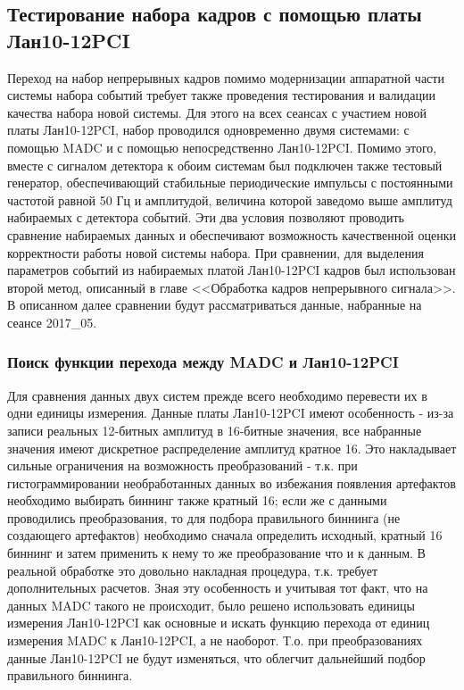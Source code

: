 \documentclass[a4paper,14pt]{extreport}
\begin{document}
\subsection{Тестирование набора кадров с помощью платы Лан10-12PCI}
Переход на набор непрерывных кадров помимо модернизации аппаратной части системы набора событий требует также проведения тестирования и валидации качества набора новой системы. Для этого на всех сеансах с участием новой платы Лан10-12PCI, набор проводился одновременно двумя системами: с помощью MADC и с помощью непосредственно Лан10-12PCI. Помимо этого, вместе с сигналом детектора к обоим системам был подключен также тестовый генератор, обеспечивающий стабильные периодические импульсы с постоянными частотой равной 50 Гц и амплитудой, величина которой заведомо выше амплитуд набираемых с детектора событий. Эти два условия позволяют проводить сравнение набираемых данных и обеспечивают возможность качественной оценки корректности работы новой системы набора. При сравнении, для выделения параметров событий из набираемых платой Лан10-12PCI кадров был использован второй метод, описанный в главе <<Обработка кадров непрерывного сигнала>>. В описанном далее сравнении будут рассматриваться данные, набранные на сеансе 2017\_05.

\subsubsection{Поиск функции перехода между MADC и Лан10-12PCI}
Для сравнения данных двух систем прежде всего необходимо перевести их в одни единицы измерения. Данные платы Лан10-12PCI имеют особенность - из-за записи реальных 12-битных амплитуд в 16-битные значения, все набранные значения имеют дискретное распределение амплитуд кратное 16. Это накладывает сильные ограничения на возможность преобразований - т.к. при гистограммировании необработанных данных во избежания появления артефактов необходимо выбирать биннинг также кратный 16; если же с данными проводились преобразования, то для подбора правильного биннинга (не создающего артефактов) необходимо сначала определить исходный, кратный 16 биннинг и затем применить к нему то же преобразование что и к данным. В реальной обработке это довольно накладная процедура, т.к. требует дополнительных расчетов. Зная эту особенность и учитывая тот факт, что на данных MADC такого не происходит, было решено использовать единицы измерения Лан10-12PCI как основные и искать функцию перехода от единиц измерения MADC к  Лан10-12PCI, а не наоборот. Т.о. при преобразованиях данные Лан10-12PCI не будут изменяться, что облегчит дальнейший подбор правильного биннинга.
\end{document}
